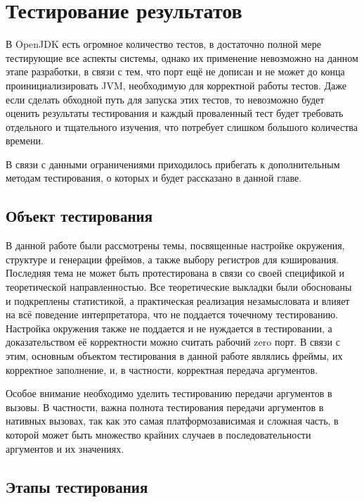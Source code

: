 \section{Тестирование результатов}

В OpenJDK есть огромное количество тестов, в достаточно полной мере тестирующие все аспекты системы, однако их применение невозможно на данном этапе разработки, в связи с тем, что порт ещё не дописан и не может до конца проинициализировать JVM, необходимую для корректной работы тестов.
Даже если сделать обходной путь для запуска этих тестов, то невозможно будет оценить результаты тестирования и каждый проваленный тест будет требовать отдельного и тщательного изучения, что потребует слишком большого количества времени.

В связи с данными ограничениями приходилось прибегать к дополнительным методам тестирования, о которых и будет рассказано в данной главе.



\subsection{Объект тестирования}

В данной работе были рассмотрены темы, посвященные настройке окружения, структуре и генерации фреймов, а также выбору регистров для кэширования. Последняя тема не может быть протестирована в связи со своей спецификой и теоретической направленностью. Все теоретические выкладки были обоснованы и подкреплены статистикой, а практическая реализация незамысловата и влияет на всё поведение интерпретатора, что не поддается точечному тестированию. Настройка окружения также не поддается и не нуждается в тестировании, а доказательством её корректности можно считать рабочий zero порт. В связи с этим, основным объектом тестирования в данной работе являлись фреймы, их корректное заполнение, и, в частности, корректная передача аргументов.

Особое внимание необходимо уделить тестированию передачи аргументов в вызовы. В частности, важна полнота тестирования передачи аргументов в нативных вызовах, так как это самая платформозависимая и сложная часть, в которой может быть множество крайних случаев в последовательности аргументов и их значениях.


\subsection{Этапы тестирования}


